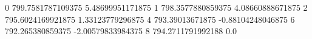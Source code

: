 0 799.7581787109375 5.48699951171875
1 798.3577880859375 4.08660888671875
2 795.6024169921875 1.33123779296875
4 793.39013671875 -0.88104248046875
6 792.265380859375 -2.00579833984375
8 794.2711791992188 0.0
